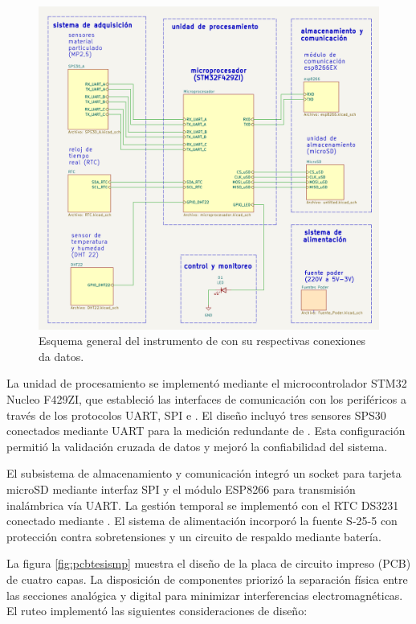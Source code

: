 \begin{figure}[H]
	\centering
	\includegraphics[width=1\linewidth]{Figures/esquema_general}
	\caption{Esquema general del instrumento de \MPF con su respectivas conexiones da datos.}
	\label{fig:esquematicogeneral}
\end{figure}

La unidad de procesamiento se implementó mediante el microcontrolador STM32 Nucleo F429ZI, que estableció las interfaces de comunicación con los periféricos a través de los protocolos UART, SPI e \IIC. El diseño incluyó tres sensores SPS30 conectados mediante UART para la medición redundante de \MPF. Esta configuración permitió la validación cruzada de datos y mejoró la confiabilidad del sistema.

El subsistema de almacenamiento y comunicación integró un socket para tarjeta microSD mediante interfaz SPI y el módulo ESP8266 para transmisión inalámbrica vía UART. La gestión temporal se implementó con el RTC DS3231 conectado mediante \IIC. El sistema de alimentación incorporó la fuente S-25-5 con protección contra sobretensiones y un circuito de respaldo mediante batería.

La figura \ref{fig:pcbtesismp} muestra el diseño de la placa de circuito impreso (PCB) de cuatro capas. La disposición de componentes priorizó la separación física entre las secciones analógica y digital para minimizar interferencias electromagnéticas. El ruteo implementó las siguientes consideraciones de diseño:

